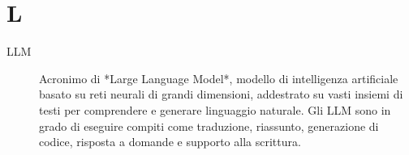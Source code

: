 
\section*{L}
\begin{description}
    \item[LLM] Acronimo di *Large Language Model*, modello di intelligenza artificiale basato su reti neurali di grandi dimensioni, addestrato su vasti insiemi di testi per comprendere e generare linguaggio naturale.  
    Gli LLM sono in grado di eseguire compiti come traduzione, riassunto, generazione di codice, risposta a domande e supporto alla scrittura. 
\end{description}

